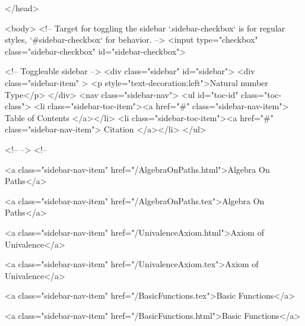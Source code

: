   
</head>




  <body>
    <!-- Target for toggling the sidebar `.sidebar-checkbox` is for regular
     styles, `#sidebar-checkbox` for behavior. -->
<input type="checkbox" class="sidebar-checkbox" id="sidebar-checkbox">

<!-- Toggleable sidebar -->
<div class="sidebar" id="sidebar">
  <div class="sidebar-item" >
    <p style="text-decoration:left">Natural number Type</p>
  </div>
  <nav class="sidebar-nav">
    <ul id="toc-id" class="toc-class">
  <li class="sidebar-toc-item"><a href="#" class="sidebar-nav-item"> Table of Contents </a></li>
  <li class="sidebar-toc-item"><a href="#" class="sidebar-nav-item"> Citation </a></li>
</ul>


    <!--  -->
    <!-- 
      
    
      
    
      
    
      
        
      
    
      
        
          <a class="sidebar-nav-item" href="/AlgebraOnPaths.html">Algebra On Paths</a>
        
      
    
      
        
          <a class="sidebar-nav-item" href="/AlgebraOnPaths.tex">Algebra On Paths</a>
        
      
    
      
        
          <a class="sidebar-nav-item" href="/UnivalenceAxiom.html">Axiom of Univalence</a>
        
      
    
      
        
          <a class="sidebar-nav-item" href="/UnivalenceAxiom.tex">Axiom of Univalence</a>
        
      
    
      
        
          <a class="sidebar-nav-item" href="/BasicFunctions.tex">Basic Functions</a>
        
      
    
      
        
          <a class="sidebar-nav-item" href="/BasicFunctions.html">Basic Functions</a>
        
      
    
      
        
